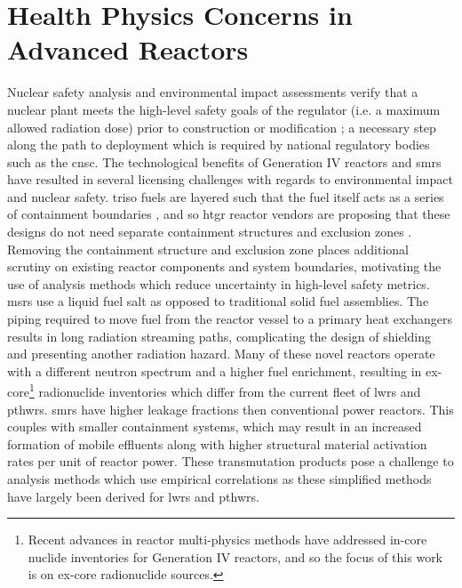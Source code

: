 \section{Health Physics Concerns in Advanced Reactors}
\label{introduction:hp_advanced}

Nuclear safety analysis and environmental impact assessments verify that a nuclear plant meets the high-level safety goals of the regulator (i.e. a maximum allowed radiation dose) prior to construction or modification \cite{regdoc_2_4_1, regdoc_2_5_2}; a necessary step along the path to deployment which is required by national regulatory bodies such as the \acrfull{cnsc}. The technological benefits of Generation IV reactors and \acrshort{smrs} have resulted in several licensing challenges with regards to environmental impact and nuclear safety. \acrshort{triso} fuels are layered such that the fuel itself acts as a series of containment boundaries \cite{triso_ref_piro}, and so \acrshort{htgr} reactor vendors are proposing that these designs do not need separate containment structures and exclusion zones \cite{iaea_2022_lessons_learned}. Removing the containment structure and exclusion zone places additional scrutiny on existing reactor components and system boundaries, motivating the use of analysis methods which reduce uncertainty in high-level safety metrics. \acrshort{msr}s use a liquid fuel salt as opposed to traditional solid fuel assemblies. The piping required to move fuel from the reactor vessel to a primary heat exchangers results in long radiation streaming paths, complicating the design of shielding and presenting another radiation hazard. Many of these novel reactors operate with a different neutron spectrum and a higher fuel enrichment, resulting in ex-core\footnote{Recent advances in reactor multi-physics methods have addressed in-core nuclide inventories for Generation IV reactors, and so the focus of this work is on ex-core radionuclide sources.} radionuclide inventories which differ from the current fleet of \acrshort{lwrs} and \acrshort{pthwrs}. \acrshort{smrs} have higher leakage fractions then conventional power reactors. This couples with smaller containment systems, which may result in an increased formation of mobile effluents along with higher structural material activation rates per unit of reactor power. These transmutation products pose a challenge to analysis methods which use empirical correlations as these simplified methods have largely been derived for \acrshort{lwrs} and \acrshort{pthwrs}.

